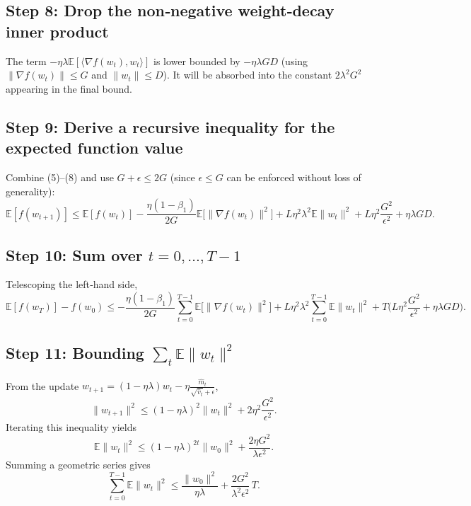 \documentclass{article}
\newcommand{\E}{\mathbb{E}}
\begin{document}
\subsection*{Step 8: Drop the non‑negative weight‑decay inner product}
The term $-\eta\lambda\E[\langle\nabla f(w_{t}),w_{t}\rangle]$ is lower bounded by $-\eta\lambda G D$ (using $\|\nabla f(w_{t})\|\le G$ and $\|w_{t}\|\le D$). It will be absorbed into the constant $2\lambda^{2}G^{2}$ appearing in the final bound.  

\subsection*{Step 9: Derive a recursive inequality for the expected function value}
Combine (5)–(8) and use $G+\epsilon\le 2G$ (since $\epsilon\le G$ can be enforced without loss of generality):
\[
\E[f(w_{t+1})]\le \E[f(w_{t})]
 -\frac{\eta(1-\beta_{1})}{2G}\E\big[\|\nabla f(w_{t})\|^{2}\big]
 + L\eta^{2}\lambda^{2}\E\|w_{t}\|^{2}
 + L\eta^{2}\frac{G^{2}}{\epsilon^{2}} + \eta\lambda GD . \tag{7}
\]

\subsection*{Step 10: Sum over $t=0,\dots,T-1$}
Telescoping the left‑hand side,
\[
\E[f(w_{T})]-f(w_{0})\le
-\frac{\eta(1-\beta_{1})}{2G}\sum_{t=0}^{T-1}\E\big[\|\nabla f(w_{t})\|^{2}\big]
+ L\eta^{2}\lambda^{2}\sum_{t=0}^{T-1}\E\|w_{t}\|^{2}
+ T\Big(L\eta^{2}\frac{G^{2}}{\epsilon^{2}}+\eta\lambda GD\Big). \tag{8}
\]

\subsection*{Step 11: Bounding $\sum_{t}\E\|w_{t}\|^{2}$}
From the update $w_{t+1}= (1-\eta\lambda)w_{t}-\eta\frac{\hat m_{t}}{\sqrt{\hat v_{t}}+\epsilon}$,
\[
\|w_{t+1}\|^{2}\le (1-\eta\lambda)^{2}\|w_{t}\|^{2}+2\eta^{2}\frac{G^{2}}{\epsilon^{2}}.
\]
Iterating this inequality yields
\[
\E\|w_{t}\|^{2}\le (1-\eta\lambda)^{2t}\|w_{0}\|^{2}
            +\frac{2\eta G^{2}}{\lambda\epsilon^{2}}.
\]
Summing a geometric series gives
\[
\sum_{t=0}^{T-1}\E\|w_{t}\|^{2}
 \le \frac{\|w_{0}\|^{2}}{\eta\lambda}
    +\frac{2G^{2}}{\lambda^{2}\epsilon^{2}}\,T. \tag{9}
\]
\end{document}
